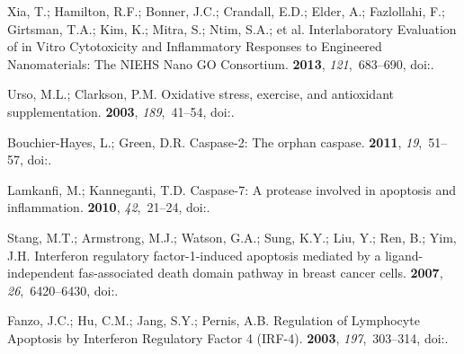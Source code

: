 \documentclass[ijms,article,accept,moreauthors,pdftex]{Definitions/mdpi}
\begin{document}
\begin{thebibliography}{999}
Xia, T.; Hamilton, R.F.; Bonner, J.C.; Crandall, E.D.; Elder, A.; Fazlollahi,
  F.; Girtsman, T.A.; Kim, K.; Mitra, S.; Ntim, S.A.; et al.
\newblock Interlaboratory Evaluation of in Vitro Cytotoxicity and Inflammatory
  Responses to Engineered Nanomaterials: The {NIEHS} Nano {GO} Consortium.
 {\bf 2013}, {\em
  121},~683--690,
\newblock
  doi:{\href{https://doi.org/10.1289/ehp.1306561}{}}.

Urso, M.L.; Clarkson, P.M.
\newblock Oxidative stress, exercise, and antioxidant supplementation.
 {\bf 2003}, {\em 189},~41--54,
\newblock
  doi:{\href{https://doi.org/10.1016/s0300-483x(03)00151-3}{}}.

Bouchier-Hayes, L.; Green, D.R.
\newblock Caspase-2: The orphan caspase.
 {\bf 2011}, {\em 19},~51--57,
\newblock
  doi:{\href{https://doi.org/10.1038/cdd.2011.157}{}}.

Lamkanfi, M.; Kanneganti, T.D.
\newblock Caspase-7: A protease involved in apoptosis and inflammation.
  {\bf 2010}, {\em 42},~21--24,
\newblock
  doi:{\href{https://doi.org/10.1016/j.biocel.2009.09.013}{}}.

Stang, M.T.; Armstrong, M.J.; Watson, G.A.; Sung, K.Y.; Liu, Y.; Ren, B.; Yim,
  J.H.
\newblock Interferon regulatory factor-1-induced apoptosis mediated by a
  ligand-independent fas-associated death domain pathway in breast cancer
  cells.
 {\bf 2007}, {\em 26},~6420--6430,
\newblock
  doi:{\href{https://doi.org/10.1038/sj.onc.1210470}{}}.

Fanzo, J.C.; Hu, C.M.; Jang, S.Y.; Pernis, A.B.
\newblock Regulation of Lymphocyte Apoptosis by Interferon Regulatory Factor 4
  ({IRF}-4).
 {\bf 2003}, {\em
  197},~303--314,
\newblock
  doi:{\href{https://doi.org/10.1084/jem.20020717}{}}.


\end{thebibliography}
\end{document}
